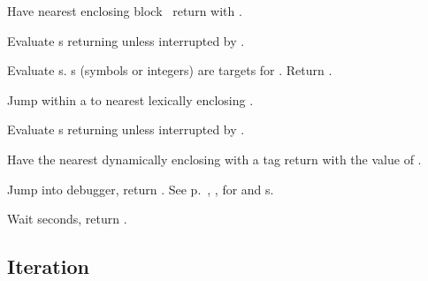 \begin{LIST}{1cm}
  Have nearest enclosing block \NIL\ return with .

   Evaluate s returning
   unless interrupted by .

  Evaluate s. s (symbols or integers) are targets
  for . Return \retval{\NIL}. 

   Jump within a  to nearest
  lexically enclosing  .

    Evaluate s returning
   unless interrupted by .

   Have the nearest dynamically
  enclosing  with a tag   return with the
  value of .

  Jump into debugger, return \retval{\NIL}.
  See p.\ \pageref{section:Format}, , for 
  and s. 

   Wait  seconds, return \retval{\NIL}.

\end{LIST}



\subsection{Iteration}


